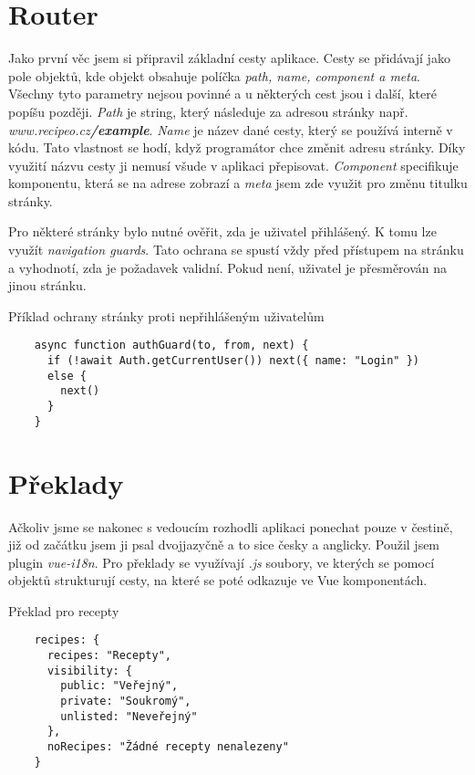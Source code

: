 \section{Router}
Jako první věc jsem si připravil základní cesty aplikace. Cesty se přidávají jako pole objektů, kde objekt obsahuje políčka \emph{path, name, component \emph{a} meta}.
Všechny tyto parametry nejsou povinné a u některých cest jsou i další, které popíšu později. \emph{Path} je string, který následuje za adresou stránky např.
\emph{www.recipeo.cz\textbf{/example}}. \emph{Name} je název dané cesty, který se používá interně v kódu. Tato vlastnost se hodí, když programátor chce změnit adresu stránky.
Díky využití názvu cesty ji nemusí všude v aplikaci přepisovat. \emph{Component} specifikuje komponentu, která se na adrese zobrazí a \emph{meta} jsem zde využit pro změnu
titulku stránky.

Pro některé stránky bylo nutné ověřit, zda je uživatel přihlášený. K tomu lze využít \emph{navigation guards}. Tato ochrana se spustí
vždy před přístupem na stránku a vyhodnotí, zda je požadavek validní. Pokud není, uživatel je přesměrován na jinou stránku.

\begin{listing}[h]
    \caption{Příklad ochrany stránky proti nepřihlášeným uživatelům}
    \begin{verbatim}
    async function authGuard(to, from, next) {
      if (!await Auth.getCurrentUser()) next({ name: "Login" })
      else {
        next()
      }
    }
    \end{verbatim}
\end{listing}

\section{Překlady}
Ačkoliv jsme se nakonec s vedoucím rozhodli aplikaci ponechat pouze v čestině, již od začátku jsem ji psal dvojjazyčně a to sice
česky a anglicky. Použil jsem plugin \emph{vue-i18n}. Pro překlady se využívají \emph{.js} soubory, ve kterých se pomocí objektů
strukturují cesty, na které se poté odkazuje ve Vue komponentách.

\begin{listing}[h]
    \caption{Překlad pro recepty}
    \begin{verbatim}
    recipes: {
      recipes: "Recepty",
      visibility: {
        public: "Veřejný",
        private: "Soukromý",
        unlisted: "Neveřejný"
      },
      noRecipes: "Žádné recepty nenalezeny"
    }
    \end{verbatim}
\end{listing}

